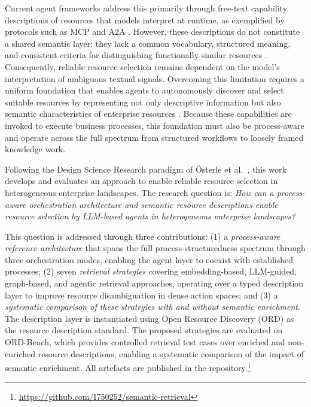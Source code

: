 \documentclass[10pt,twocolumn]{article}
\begin{document}
Current agent frameworks address this primarily through free-text capability descriptions of resources that models interpret at runtime, as exemplified by protocols such as MCP and A2A \citep{noauthor_specification_nodate,catalog_ai_nodate}. However, these descriptions do not constitute a shared semantic layer: they lack a common vocabulary, structured meaning, and consistent criteria for distinguishing functionally similar resources \citep{hasan_model_2026}. Consequently, reliable resource selection remains dependent on the model's interpretation of ambiguous textual signals. Overcoming this limitation requires a uniform foundation that enables agents to autonomously discover and select suitable resources by representing not only descriptive information but also semantic characteristics of enterprise resources \citep{mcilraith_semantic_2001}. Because these capabilities are invoked to execute business processes, this foundation must also be process-aware and operate across the full spectrum from structured workflows to loosely framed knowledge work.

Following the Design Science Research paradigm of Österle et al.\ \citep{osterle2010}, this work develops and evaluates an approach to enable reliable resource selection in heterogeneous enterprise landscapes. The research question is: \textit{How can a process-aware orchestration architecture and semantic resource descriptions enable resource selection by LLM-based agents in heterogeneous enterprise landscapes?}

This question is addressed through three contributions: (1) a \textit{process-aware reference architecture} that spans the full process-structuredness spectrum through three orchestration modes, enabling the agent layer to coexist with established processes; (2) seven \textit{retrieval strategies} covering embedding-based, LLM-guided, graph-based, and agentic retrieval approaches, operating over a typed description layer to improve resource disambiguation in dense action spaces; and (3) a \textit{systematic comparison of these strategies with and without semantic enrichment}. The description layer is instantiated using Open Resource Discovery (ORD) as the resource description standard. The proposed strategies are evaluated on ORD-Bench, which provides controlled retrieval test cases over enriched and non-enriched resource descriptions, enabling a systematic comparison of the impact of semantic enrichment. All artefacts are published in the repository.\footnote{\url{https://github.com/I750252/semantic-retrieval}}
\end{document}
